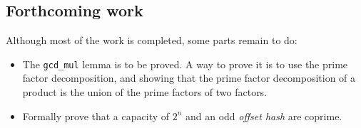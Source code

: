 \documentclass[oneside]{article}
\begin{document}
\subsection{Forthcoming work}
Although most of the work is completed, some parts remain to do: 
\begin{itemize}
	\item The \texttt{gcd\_mul} lemma is to be proved. A way to prove it is to use the prime factor decomposition, and showing that the prime factor decomposition of a product is the union of the prime factors of two factors.
	\item Formally prove that a capacity of $2^n$ and an odd \emph{offset hash} are coprime.
\end{itemize}
\end{document}
